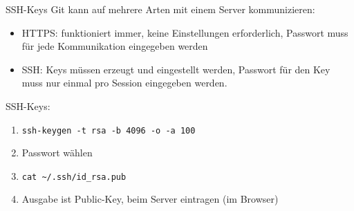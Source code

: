 \begin{frame}{SSH-Keys}
  Git kann auf mehrere Arten mit einem Server kommunizieren:
  \begin{itemize}
    \item HTTPS: funktioniert immer, keine Einstellungen erforderlich, Passwort muss für jede Kommunikation eingegeben werden
    \item SSH: Keys müssen erzeugt und eingestellt werden, Passwort für den Key muss nur einmal pro Session eingegeben werden.
  \end{itemize}

  SSH-Keys:
  \begin{enumerate}
    \item \texttt{ssh-keygen -t rsa -b 4096 -o -a 100}
    \item Passwort wählen
    \item \texttt{cat \textasciitilde/.ssh/id\_rsa.pub}
    \item Ausgabe ist Public-Key, beim Server eintragen (im Browser)
  \end{enumerate}
\end{frame}
